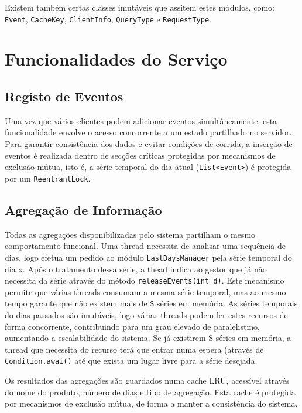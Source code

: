 \documentclass[11pt, a4paper, fleqn]{article}
\begin{document}
	Existem também certas classes imutáveis que assitem estes módulos, como: \texttt{Event}, \texttt{CacheKey}, \texttt{ClientInfo}, \texttt{QueryType} e \texttt{RequestType}.
	
	
	\section{Funcionalidades do Serviço}
	
	\subsection{Registo de Eventos}
	
	Uma vez que vários clientes podem adicionar eventos simultâneamente, esta funcionalidade envolve o acesso concorrente a um estado partilhado no servidor. Para garantir consistência dos dados e evitar condições de corrida, a inserção de eventos é realizada dentro de secções críticas protegidas por mecanismos de exclusão mútua, isto é, a série temporal do dia atual (\texttt{List<Event>}) é protegida por um \texttt{ReentrantLock}.
	
	
	\subsection{Agregação de Informação}
	
	Todas as agregações disponibilizadas pelo sistema partilham o mesmo comportamento funcional. Uma thread necessita de analisar uma sequência de dias, logo efetua um pedido ao módulo \texttt{LastDaysManager} pela série temporal do dia x. Após o tratamento dessa série, a thead indica ao gestor que já não necessita da série através do método \texttt{releaseEvents(int d)}. Este mecanismo permite que várias threads consumam a mesma série temporal, mas ao mesmo tempo garante que não existem mais de \texttt{S} séries em memória. As séries temporais do dias passados são imutáveis, logo várias threads podem ler estes recursos de forma concorrente, contribuindo para um grau elevado de paralelistmo, aumentando a escalabilidade do sistema. Se já existirem S séries em memória, a thread que necessita do recurso terá que entrar numa espera (através de \texttt{Condition.awai()} até que exista um lugar livre para a série desejada.
	
	Os resultados das agregações são guardados numa cache LRU, acessível através do nome do produto, número de dias e tipo de agregação. Esta cache é protegida por mecanismos de exclusão mútua, de forma a manter a consistência do sistema.
	
\end{document}
